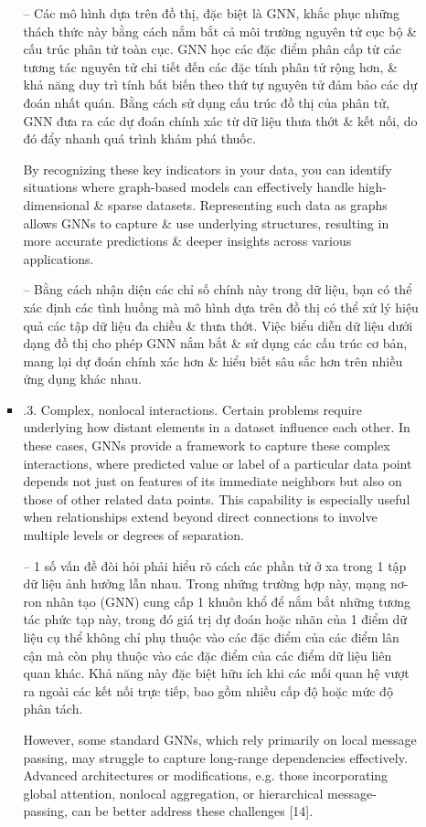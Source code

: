 \documentclass{article}
\begin{document}
\begin{itemize}
\begin{itemize}
\begin{itemize}
            -- Các mô hình dựa trên đồ thị, đặc biệt là GNN, khắc phục những thách thức này bằng cách nắm bắt cả môi trường nguyên tử cục bộ \& cấu trúc phân tử toàn cục. GNN học các đặc điểm phân cấp từ các tương tác nguyên tử chi tiết đến các đặc tính phân tử rộng hơn, \& khả năng duy trì tính bất biến theo thứ tự nguyên tử đảm bảo các dự đoán nhất quán. Bằng cách sử dụng cấu trúc đồ thị của phân tử, GNN đưa ra các dự đoán chính xác từ dữ liệu thưa thớt \& kết nối, do đó đẩy nhanh quá trình khám phá thuốc.

            By recognizing these key indicators in your data, you can identify situations where graph-based models can effectively handle high-dimensional \& sparse datasets. Representing such data as graphs allows GNNs to capture \& use underlying structures, resulting in more accurate predictions \& deeper insights across various applications.

            -- Bằng cách nhận diện các chỉ số chính này trong dữ liệu, bạn có thể xác định các tình huống mà mô hình dựa trên đồ thị có thể xử lý hiệu quả các tập dữ liệu đa chiều \& thưa thớt. Việc biểu diễn dữ liệu dưới dạng đồ thị cho phép GNN nắm bắt \& sử dụng các cấu trúc cơ bản, mang lại dự đoán chính xác hơn \& hiểu biết sâu sắc hơn trên nhiều ứng dụng khác nhau.
            \item {.3. Complex, nonlocal interactions.} Certain problems require underlying how distant elements in a dataset influence each other. In these cases, GNNs provide a framework to capture these complex interactions, where predicted value or label of a particular data point depends not just on features of its immediate neighbors but also on those of other related data points. This capability is especially useful when relationships extend beyond direct connections to involve multiple levels or degrees of separation.

            -- 1 số vấn đề đòi hỏi phải hiểu rõ cách các phần tử ở xa trong 1 tập dữ liệu ảnh hưởng lẫn nhau. Trong những trường hợp này, mạng nơ-ron nhân tạo (GNN) cung cấp 1 khuôn khổ để nắm bắt những tương tác phức tạp này, trong đó giá trị dự đoán hoặc nhãn của 1 điểm dữ liệu cụ thể không chỉ phụ thuộc vào các đặc điểm của các điểm lân cận mà còn phụ thuộc vào các đặc điểm của các điểm dữ liệu liên quan khác. Khả năng này đặc biệt hữu ích khi các mối quan hệ vượt ra ngoài các kết nối trực tiếp, bao gồm nhiều cấp độ hoặc mức độ phân tách.

            However, some standard GNNs, which rely primarily on local message passing, may struggle to capture long-range dependencies effectively. Advanced architectures or modifications, e.g. those incorporating global attention, nonlocal aggregation, or hierarchical message-passing, can be better address these challenges [14].


\end{itemize}
\end{itemize}
\end{itemize}
\end{document}

